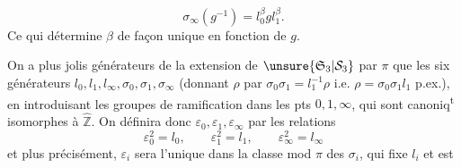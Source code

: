 \[
\sigma_\infty(g^{-1})=l_0^\beta g l_1^\beta.
\]
Ce qui détermine $\beta$ de façon unique en fonction de $g$.


On a  plus jolis générateurs de la extension de $\unsure{\mathfrak S_3|\mathcal S_3}$ par $\pi$  que les six générateurs $l_0,l_1,l_\infty,\sigma_0,\sigma_1,\sigma_\infty$ (donnant $\rho$ par $\sigma_0\sigma_1=l_1^{-1}\rho$  i.e. $\rho=\sigma_0\sigma_1l_1$ p.ex.), en introduisant les groupes de ramification dans les pts $0,1,\infty$, qui sont canoniq\textsuperscript{t} isomorphes à $\widehat{\mathbb Z}$.
On définira donc $\varepsilon_0,\varepsilon_1,\varepsilon_\infty$ par les relations
\[
\varepsilon_0^2=l_0,\qquad\varepsilon_1^2=l_1,\qquad\varepsilon_\infty^2=l_\infty
\]
et plus précisément, $\varepsilon_i$ sera l'unique   dans la classe mod $\pi$ des $\sigma_i$,  qui fixe $l_i$ et est  
